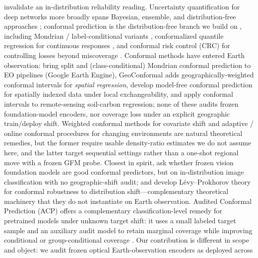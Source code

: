 \documentclass[preprint,11pt,authoryear]{elsarticle}
\begin{document}
invalidate an in-distribution reliability reading. Uncertainty quantification for deep networks more broadly
spans Bayesian, ensemble, and distribution-free approaches \citep{gawlikowski2023survey}; conformal
prediction is the distribution-free branch we build on
\citep{vovk2005algorithmic,shafer2008tutorial,angelopoulos2023conformal,angelopoulos2021sets,lei2018distributionfree},
including Mondrian / label-conditional variants
\citep{vovk2003mondrian,sadinle2019lac,romano2020classification,cauchois2021knowing}, conformalized
quantile regression for continuous responses \citep{romano2019cqr}, and conformal risk control (CRC)
for controlling losses beyond miscoverage \citep{bates2021distributionfree,angelopoulos2024crc}. Conformal
methods have entered Earth observation: \citet{singh2024uncertainty} bring split and (class-conditional)
Mondrian conformal prediction to EO pipelines (Google Earth Engine), GeoConformal
\citep{lou2024geoconformal} adds geographically-weighted conformal intervals for \emph{spatial regression},
\citet{mao2024spatial} develop model-free conformal prediction for spatially indexed data under local
exchangeability, and \citet{kakhani2024socconformal} apply conformal intervals to remote-sensing soil-carbon
regression; none of these audits frozen foundation-model encoders, nor coverage loss under an
explicit geographic train/deploy shift. Weighted conformal methods for covariate shift
\citep{tibshirani2019covariate} and adaptive / online conformal procedures for changing environments
\citep{gibbs2021adaptive,gibbs2024online,barber2023conformal} are natural theoretical remedies, but the
former require usable density-ratio estimates we do not assume here, and the latter target sequential
settings rather than a one-shot regional move with a frozen GFM probe.
Closest in spirit, \citet{fillioux2024fmconformal} ask whether frozen vision foundation models are good
conformal predictors, but on in-distribution image classification with no geographic-shift audit; and
\citet{aolaritei2025levyprokhorov} develop L\'evy--Prokhorov theory for conformal robustness to distribution
shift---complementary theoretical machinery that they do not instantiate on Earth observation. Audited
Conformal Prediction (ACP) offers a complementary classification-level remedy for pretrained models under
unknown target shift: it uses a small labeled target sample and an auxiliary audit model to retain marginal
coverage while improving conditional or group-conditional coverage \citep{zhou2026acp}. Our contribution is
different in scope and object: we audit frozen optical Earth-observation encoders as deployed across
\end{document}
